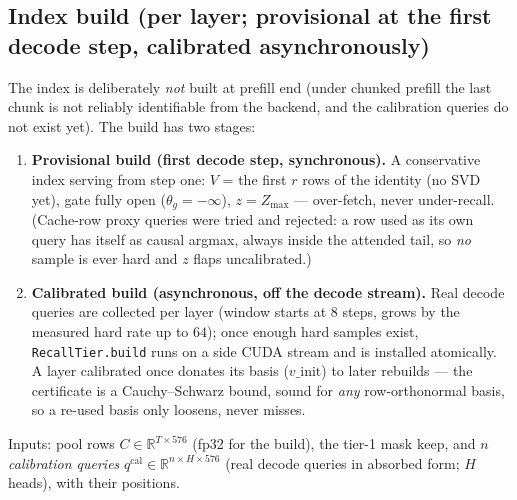 \documentclass[11pt]{article}
\newcommand{\keep}{\mathrm{keep}}
\begin{document}
\subsection{Index build (per layer; provisional at the first decode step,
calibrated asynchronously)}\label{sec:build}
The index is deliberately \emph{not} built at prefill end (under chunked
prefill the last chunk is not reliably identifiable from the backend, and the
calibration queries do not exist yet). The build has two stages:
\begin{enumerate}[itemsep=1pt]
\item \textbf{Provisional build (first decode step, synchronous).} A
conservative index serving from step one: $V$ = the first $r$ rows of the
identity (no SVD yet), gate fully open ($\theta_g=-\infty$), $z = Z_{\max}$
--- over-fetch, never under-recall. (Cache-row proxy queries were tried and
rejected: a row used as its own query has itself as causal argmax, always
inside the attended tail, so \emph{no} sample is ever hard and $z$ flaps
uncalibrated.)
\item \textbf{Calibrated build (asynchronous, off the decode stream).} Real
decode queries are collected per layer (window starts at $8$ steps,
grows by the measured hard rate up to $64$); once enough hard samples exist,
\texttt{RecallTier.build} runs on a side CUDA stream and is installed
atomically. A layer calibrated once donates its basis ($v\_{\text{init}}$)
to later rebuilds --- the certificate is a Cauchy--Schwarz bound, sound for
\emph{any} row-orthonormal basis, so a re-used basis only loosens, never
misses.
\end{enumerate}
Inputs: pool rows $C \in \mathbb{R}^{T\times 576}$ (fp32 for the build), the
tier-1 mask $\keep$, and $n$ \emph{calibration queries}
$q^{\mathrm{cal}} \in \mathbb{R}^{n\times H\times 576}$ (real decode queries
in absorbed form; $H$ heads), with their positions.
\end{document}

